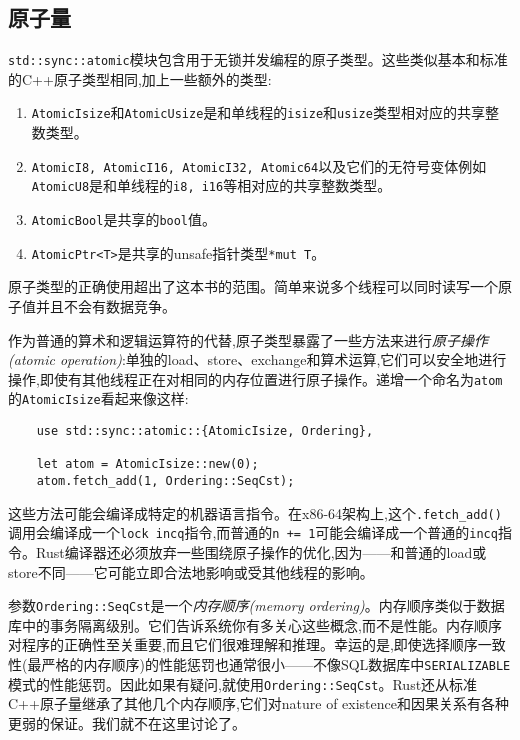 \subsection{原子量}\label{atomic}
\texttt{std::sync::atomic}模块包含用于无锁并发编程的原子类型。这些类似基本和标准的C++原子类型相同,加上一些额外的类型:
\begin{enumerate}
    \item \texttt{AtomicIsize}和\texttt{AtomicUsize}是和单线程的\texttt{isize}和\texttt{usize}类型相对应的共享整数类型。
    \item \texttt{AtomicI8, AtomicI16, AtomicI32, Atomic64}以及它们的无符号变体例如\texttt{AtomicU8}是和单线程的\texttt{i8, i16}等相对应的共享整数类型。
    \item \texttt{AtomicBool}是共享的\texttt{bool}值。
    \item \texttt{AtomicPtr<T>}是共享的unsafe指针类型\texttt{*mut T}。
\end{enumerate}

原子类型的正确使用超出了这本书的范围。简单来说多个线程可以同时读写一个原子值并且不会有数据竞争。

作为普通的算术和逻辑运算符的代替,原子类型暴露了一些方法来进行\emph{原子操作(atomic operation)}:单独的load、store、exchange和算术运算,它们可以安全地进行操作,即使有其他线程正在对相同的内存位置进行原子操作。递增一个命名为\texttt{atom}的\texttt{AtomicIsize}看起来像这样:
\begin{verbatim}
    use std::sync::atomic::{AtomicIsize, Ordering},

    let atom = AtomicIsize::new(0);
    atom.fetch_add(1, Ordering::SeqCst);
\end{verbatim}

这些方法可能会编译成特定的机器语言指令。在x86-64架构上,这个\texttt{.fetch\_add()}调用会编译成一个\texttt{lock incq}指令,而普通的\texttt{n += 1}可能会编译成一个普通的\texttt{incq}指令。Rust编译器还必须放弃一些围绕原子操作的优化,因为——和普通的load或store不同——它可能立即合法地影响或受其他线程的影响。 

参数\texttt{Ordering::SeqCst}是一个\emph{内存顺序(memory ordering)}。内存顺序类似于数据库中的事务隔离级别。它们告诉系统你有多关心这些概念,而不是性能。内存顺序对程序的正确性至关重要,而且它们很难理解和推理。幸运的是,即使选择顺序一致性(最严格的内存顺序)的性能惩罚也通常很小——不像SQL数据库中\texttt{SERIALIZABLE}模式的性能惩罚。因此如果有疑问,就使用\texttt{Ordering::SeqCst}。Rust还从标准C++原子量继承了其他几个内存顺序,它们对nature of existence和因果关系有各种更弱的保证。我们就不在这里讨论了。

